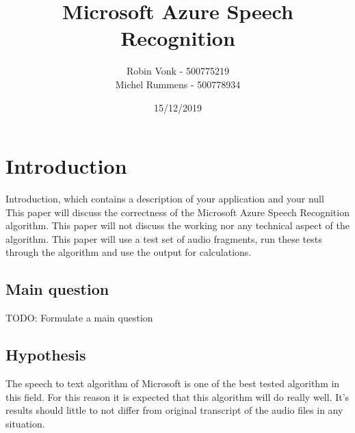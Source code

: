 \documentclass{article}
\begin{document}
\title{Microsoft Azure Speech Recognition}
\author{Robin Vonk - 500775219 \\
		Michel Rummens - 500778934 \\}
\date{15/12/2019}

\setlength{\columnsep}{30px}


\tableofcontents
\section{Introduction}
Introduction, which contains a description of your application and your null \\
This paper will discuss the correctness of the Microsoft Azure Speech Recognition algorithm. This paper will not discuss the working nor any technical aspect of the algorithm. This paper will use a test set of audio fragments, run these tests through the algorithm and use the output for calculations.



\subsection{Main question}
TODO: Formulate a main question

\subsection{Hypothesis}
The speech to text algorithm of Microsoft is one of the best tested algorithm in this field\cite{Veton}. For this reason it is expected that this algorithm will do really well. It's results should little to not differ from original transcript of the audio files in any situation.
\end{document}
